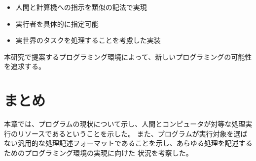 \begin{itemize}
\itemsep1pt\parskip0pt
\item
  人間と計算機への指示を類似の記法で実現
\item
  実行者を具体的に指定可能
\item
  実世界のタスクを処理することを考慮した実装
\end{itemize}

本研究で提案するプログラミング環境によって、新しいプログラミングの可能性を追求する。

\section{まとめ}\label{ux307eux3068ux3081}

本章では、プログラムの現状について示し、人間とコンピュータが対等な処理実行のリソースであるということを示した。
また、プログラムが実行対象を選ばない汎用的な処理記述フォーマットであることを示し、あらゆる処理を記述するためのプログラミング環境の実現に向けた
状況を考察した。

